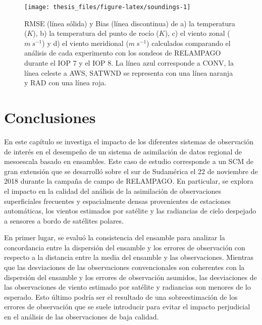 \documentclass[12pt,oneside,a4paper]{reedthesis}
\begin{document}
\begin{figure}

{\centering \texttt{[image: thesis\_files/figure-latex/soundings-1]} 

}

\caption{RMSE (línea sólida) y Bias (línea discontinua) de a) la temperatura (\(K\)), b) la temperatura del punto de rocío (\(K\)), c) el viento zonal (\(m\ s^{-1}\)) y d) el viento meridional (\(m\ s^{-1}\)) calculados comparando el análisis de cada experimento con los sondeos de RELAMPAGO durante el IOP 7 y el IOP 8. La línea azul corresponde a CONV, la línea celeste a AWS, SATWND se representa con una línea naranja y RAD con una línea roja.}\label{fig:soundings}
\end{figure}
\hypertarget{conclusiones}{%
\section{Conclusiones}\label{conclusiones}}

En este capítulo se investiga el impacto de los diferentes sistemas de observación de interés en el desempeño de un sistema de asimilación de datos regional de mesoescala basado en ensambles. Este caso de estudio corresponde a un SCM de gran extensión que se desarrolló sobre el sur de Sudamérica el 22 de noviembre de 2018 durante la campaña de campo de RELAMPAGO. En particular, se explora el impacto en la calidad del análisis de la asimilación de observaciones superficiales frecuentes y espacialmente densas provenientes de estaciones automáticas, los vientos estimados por satélite y las radiancias de cielo despejado a sensores a bordo de satélites polares.

En primer lugar, se evaluó la consistencia del ensamble para analizar la concordancia entre la dispersión del ensamble y los errores de observación con respecto a la distancia entre la media del ensamble y las observaciones. Mientras que las desviaciones de las observaciones convencionales son coherentes con la dispersión del ensamble y los errores de observación asumidos, las desviaciones de las observaciones de viento estimado por satélite y radiancias son menores de lo esperado. Esto último podría ser el resultado de una sobreestimación de los errores de observación que se suele introducir para evitar el impacto perjudicial en el análisis de las observaciones de baja calidad.
\end{document}
